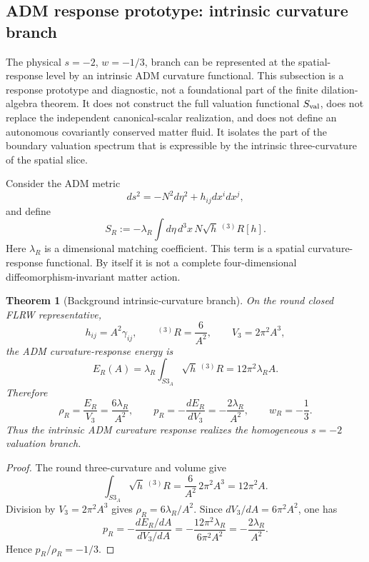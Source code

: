 \documentclass[11pt,a4paper]{article}
\def\Sthree{S3}%
\def\dd{d}%
\numberwithin{equation}{section}
\theoremstyle{definition}
\theoremstyle{plain}
\newtheorem{theorem}[criterion]{Theorem}
\theoremstyle{remark}
\newcommand{\Sthree}{S^3}
\newcommand{\dd}{\mathrm{d}}
\begin{document}
\subsection{ADM response prototype: intrinsic curvature branch}
\label{sec:ADM-curvature-response}

The physical \(s=-2\), \(w=-1/3\), branch can be represented at the
spatial-response level by an intrinsic ADM curvature functional. This subsection
is a response prototype and diagnostic, not a foundational part of the finite
dilation-algebra theorem. It does not construct the full valuation functional
\(S_{\rm val}\), does not replace the independent canonical-scalar realization,
and does not define an autonomous covariantly conserved matter fluid. It isolates
the part of the boundary valuation spectrum that is expressible by the intrinsic
three-curvature of the spatial slice.

Consider the ADM metric
\begin{equation}
\dd s^2=-N^2\dd\eta^2+h_{ij}\dd x^i\dd x^j,
\end{equation}
and define
\begin{equation}
\boxed{
S_R:=-\lambda_R\int \dd\eta\,\dd^3x\,N\sqrt h\,{}^{(3)}R[h].
}
\end{equation}
Here \(\lambda_R\) is a dimensional matching coefficient. This term is a
spatial curvature-response functional. By itself it is not a complete
four-dimensional diffeomorphism-invariant matter action.

\begin{theorem}[Background intrinsic-curvature branch]
On the round closed FLRW representative,
\begin{equation}
h_{ij}=A^2\gamma_{ij},
\qquad
{}^{(3)}R=\frac{6}{A^2},
\qquad
V_3=2\pi^2A^3,
\end{equation}
the ADM curvature-response energy is
\begin{equation}
E_R(A)=\lambda_R\int_{\Sthree_A}\sqrt h\,{}^{(3)}R
=12\pi^2\lambda_R A.
\end{equation}
Therefore
\begin{equation}
\boxed{
\rho_R=\frac{E_R}{V_3}=\frac{6\lambda_R}{A^2},
\qquad
p_R=-\frac{\dd E_R}{\dd V_3}
=-\frac{2\lambda_R}{A^2},
\qquad
w_R=-\frac13 .
}
\end{equation}
Thus the intrinsic ADM curvature response realizes the homogeneous
\(s=-2\) valuation branch.
\end{theorem}

\begin{proof}
The round three-curvature and volume give
\begin{equation}
\int_{\Sthree_A}\sqrt h\,{}^{(3)}R
=\frac{6}{A^2}\,2\pi^2A^3
=12\pi^2A .
\end{equation}
Division by \(V_3=2\pi^2A^3\) gives \(\rho_R=6\lambda_R/A^2\). Since
\(\dd V_3/\dd A=6\pi^2A^2\), one has
\begin{equation}
p_R=-\frac{\dd E_R/\dd A}{\dd V_3/\dd A}
=-\frac{12\pi^2\lambda_R}{6\pi^2A^2}
=-\frac{2\lambda_R}{A^2}.
\end{equation}
Hence \(p_R/\rho_R=-1/3\).
\end{proof}
\end{document}
